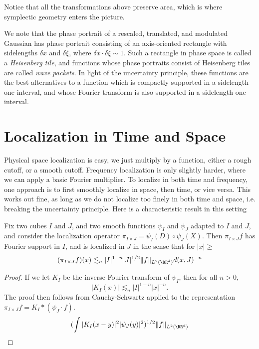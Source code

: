 Notice that all the transformations above preserve area, which is where symplectic geometry enters the picture.

We note that the phase portrait of a rescaled, translated, and modulated Gaussian has phase portrait consisting of an axis-oriented rectangle with sidelengths $\delta x$ and $\delta \xi$, where $\delta x \cdot \delta \xi \sim 1$. Such a rectangle in phase space is called a \emph{Heisenberg tile}, and functions whose phase portraits consist of Heisenberg tiles are called \emph{wave packets}. In light of the uncertainty principle, these functions are the best alternatives to a function which is compactly supported in a sidelength one interval, and whose Fourier transform is also supported in a sidelength one interval.

\section{Localization in Time and Space}

Physical space localization is easy, we just multiply by a function, either a rough cutoff, or a smooth cutoff. Frequency localization is only slightly harder, where we can apply a basic Fourier multiplier. To localize in both time and frequency, one approach is to first smoothly localize in space, then time, or vice versa. This works out fine, as long as we do not localize too finely in both time and space, i.e. breaking the uncertainty principle. Here is a characteristic result in this setting

\begin{lemma}
  Fix two cubes $I$ and $J$, and two smooth functions $\psi_I$ and $\psi_J$ adapted to $I$ and $J$, and consider the localization operator $\pi_{I \times J} = \psi_I(D) \circ \psi_J(X)$. Then $\pi_{I \times J} f$ has Fourier support in $I$, and is localized in $J$ in the sense that for $|x| \geq $
  \[ (\pi_{I \times J} f)(x) \lesssim_n |I|^{1-n} |J|^{1/2} \| f \|_{L^2(\RR^d)} d(x,J)^{-n} \]
\end{lemma}
\begin{proof}
  If we let $K_I$ be the inverse Fourier transform of $\psi_I$, then for all $n > 0$,
  \[ |K_I(x)| \lesssim_n |I|^{1-n} |x|^{-n}. \]
  The proof then follows from Cauchy-Schwartz applied to the representation $\pi_{I \times J} f = K_I * (\psi_J \cdot f)$.
  \[ (\int |K_I(x-y)|^2 |\psi_J(y)|^2)^{1/2} \| f \|_{L^2(\RR^d)} \]
\end{proof}














